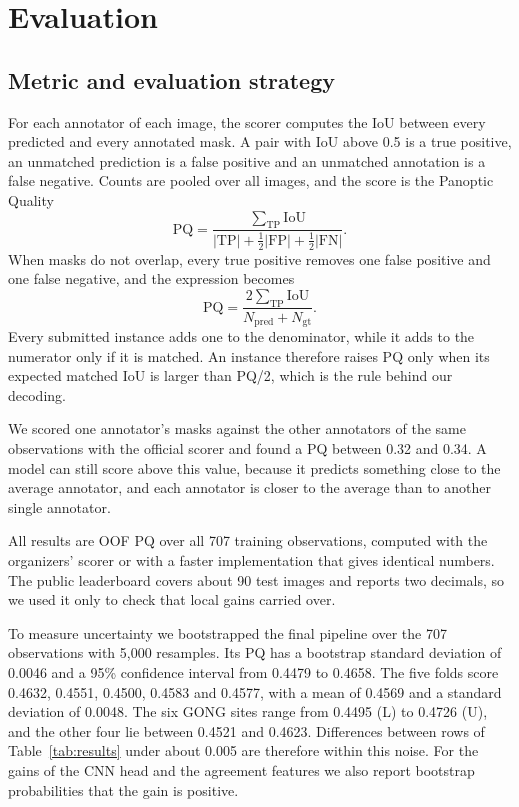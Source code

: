 \documentclass[sigconf]{acmart}
\begin{document}
\section{Evaluation}\label{sec:evaluation}

\subsection{Metric and evaluation strategy}
\label{sec:metric}

For each annotator of each image, the scorer computes the IoU between every predicted and every annotated mask. A pair with IoU above 0.5 is a true positive, an unmatched prediction is a false positive and an unmatched annotation is a false negative. Counts are pooled over all images, and the score is the Panoptic Quality \cite{kirillov2019panoptic}
\begin{equation}
\mathrm{PQ} = \frac{\sum_{\text{TP}} \mathrm{IoU}}{|\mathrm{TP}| + \frac{1}{2}|\mathrm{FP}| + \frac{1}{2}|\mathrm{FN}|}.
\end{equation}
When masks do not overlap, every true positive removes one false positive and one false negative, and the expression becomes
\begin{equation}
\mathrm{PQ} = \frac{2 \sum_{\text{TP}} \mathrm{IoU}}{N_{\text{pred}} + N_{\text{gt}}}.
\end{equation}
Every submitted instance adds one to the denominator, while it adds to the numerator only if it is matched. An instance therefore raises PQ only when its expected matched IoU is larger than PQ/2, which is the rule behind our decoding.

We scored one annotator's masks against the other annotators of the same observations with the official scorer and found a PQ between 0.32 and 0.34. A model can still score above this value, because it predicts something close to the average annotator, and each annotator is closer to the average than to another single annotator.

All results are OOF PQ over all 707 training observations, computed with the organizers' scorer or with a faster implementation that gives identical numbers. The public leaderboard covers about 90 test images and reports two decimals, so we used it only to check that local gains carried over.

To measure uncertainty we bootstrapped the final pipeline over the 707 observations with 5,000 resamples. Its PQ has a bootstrap standard deviation of 0.0046 and a 95\% confidence interval from 0.4479 to 0.4658. The five folds score 0.4632, 0.4551, 0.4500, 0.4583 and 0.4577, with a mean of 0.4569 and a standard deviation of 0.0048. The six GONG sites range from 0.4495 (L) to 0.4726 (U), and the other four lie between 0.4521 and 0.4623. Differences between rows of Table~\ref{tab:results} under about 0.005 are therefore within this noise. For the gains of the CNN head and the agreement features we also report bootstrap probabilities that the gain is positive.
\end{document}
